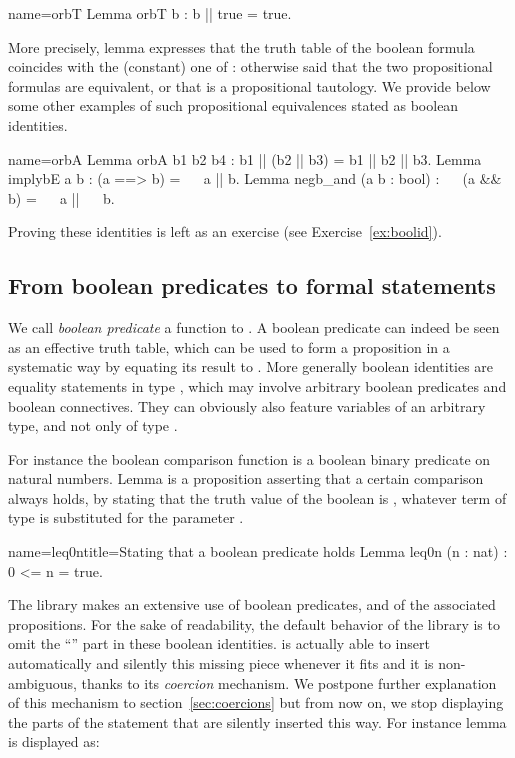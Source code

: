 \begin{coq}{name=orbT}{}
Lemma orbT b : b || true = true.
\end{coq}

More precisely, lemma 
expresses that the truth table of the boolean formula 
coincides with the (constant) one of : otherwise said that the
two propositional formulas are equivalent, or that  is a
propositional tautology. We provide below some other examples of such
propositional equivalences stated as boolean identities.

\begin{coq}{name=orbA}{}
Lemma orbA b1 b2 b4 : b1 || (b2 || b3) = b1 || b2 || b3.
Lemma implybE a b : (a ==> b) = ~~ a || b.
Lemma negb_and (a b : bool) : ~~ (a && b) = ~~ a || ~~ b.
\end{coq}
Proving these identities is left as an exercise (see
Exercise~\ref{ex:boolid}).


\subsection{From boolean predicates to formal statements}
\label{sec:bstatements}

We call \emph{boolean predicate} a function to . A boolean
predicate can indeed be seen as an effective truth table, which can be
used to form a proposition in a systematic way by equating its result
to . More generally boolean identities are equality statements
in type , which may involve arbitrary boolean predicates and boolean
connectives. They can obviously also feature variables of an arbitrary
type, and not only of type .

For instance the boolean comparison function
 is a boolean binary predicate on
natural numbers. Lemma  is a proposition asserting that a
certain comparison always holds, by stating that the truth value of
the boolean  is , whatever term  of type 
is substituted for the parameter .

\begin{coq}{name=leq0n}{title=Stating that a boolean predicate holds}
Lemma leq0n (n : nat) : 0 <= n = true.
\end{coq}

The \mcbMC{} library makes an extensive use of boolean predicates, and
of the associated propositions. For the sake of readability, the
default behavior of the  \mcbMC{} library is to omit the ``''
part in these boolean identities. \Coq{} is actually able to insert
automatically and silently this missing piece whenever it fits and
it is non-ambiguous, thanks to its \emph{coercion} mechanism. We
postpone further explanation of this mechanism to
section~\ref{sec:coercions} but from now on, we stop displaying the
 parts of the statement that are silently inserted this
way. For instance lemma  is displayed as:

